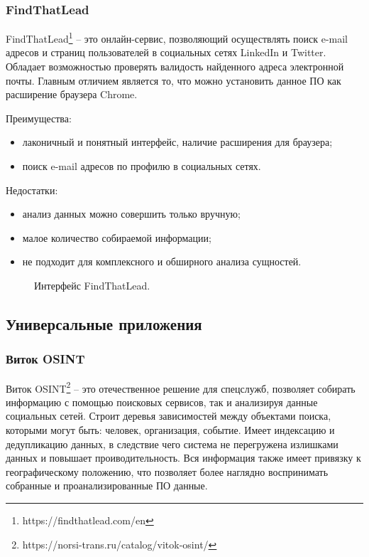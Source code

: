 \subsubsection{FindThatLead}
FindThatLead\footnote{https://findthatlead.com/en} -- это онлайн-сервис, позволяющий осуществлять поиск e-mail адресов
и страниц пользователей в социальных сетях LinkedIn и Twitter. Обладает возможностью проверять валидость найденного адреса
электронной почты. Главным отличием является то, что можно установить данное ПО как расширение браузера Chrome.

Преимущества:
\begin{itemize}
    \item лаконичный и понятный интерфейс, наличие расширения для браузера;
    \item поиск e-mail адресов по профилю в социальных сетях.
\end{itemize}

Недостатки:
\begin{itemize}
    \item анализ данных можно совершить только вручную;
    \item малое количество собираемой информации;
    \item не подходит для комплексного и обширного анализа сущностей.
\end{itemize}

\begin{figure}[H]
    \caption{Интерфейс FindThatLead.}
    \label{ris:image}
\end{figure}

\subsection{Универсальные приложения}
\subsubsection{Виток OSINT}
Виток OSINT\footnote{https://norsi-trans.ru/catalog/vitok-osint/} -- это отечественное решение для спецслужб, позволяет собирать
информацию с помощью поисковых сервисов, так и анализируя данные социальных сетей. Строит деревья зависимостей между объектами
поиска, которыми могут быть: человек, организация, событие. Имеет индексацию и дедупликацию данных, в следствие чего система
не перегружена излишками данных и повышает проиводительность. Вся информация также имеет привязку к географическому положению, что
позволяет более наглядно воспринимать собранные и проанализированные ПО данные.

